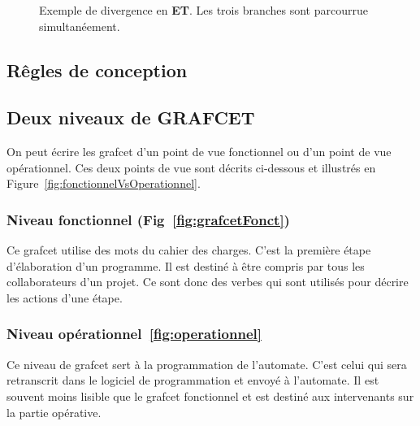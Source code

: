 \begin{figure}
  \centering
  
  \caption{Exemple de divergence en \textbf{ET}. Les trois branches sont parcourrue simultanéement.}
  \label{fig:divET}
\end{figure}

\subsection{Rêgles de conception}

\subsection{Deux niveaux de GRAFCET}
On peut écrire les grafcet d'un point de vue fonctionnel ou d'un point de vue opérationnel. Ces deux points de vue sont décrits ci-dessous et illustrés en Figure~\ref{fig:fonctionnelVsOperationnel}.
\subsubsection{Niveau fonctionnel (Fig~\ref{fig:grafcetFonct})}
Ce grafcet utilise des mots du cahier des charges. C'est la première étape d'élaboration d'un programme. Il est destiné à être compris par tous les collaborateurs d'un projet. Ce sont donc des verbes qui sont utilisés pour décrire les actions d'une étape.
\subsubsection{Niveau opérationnel~\ref{fig:operationnel}}
Ce niveau de grafcet sert à la programmation de l'automate. C'est celui qui sera retranscrit dans le logiciel de programmation et envoyé à l'automate. Il est souvent moins lisible que le grafcet fonctionnel et est destiné aux intervenants sur la partie opérative.

